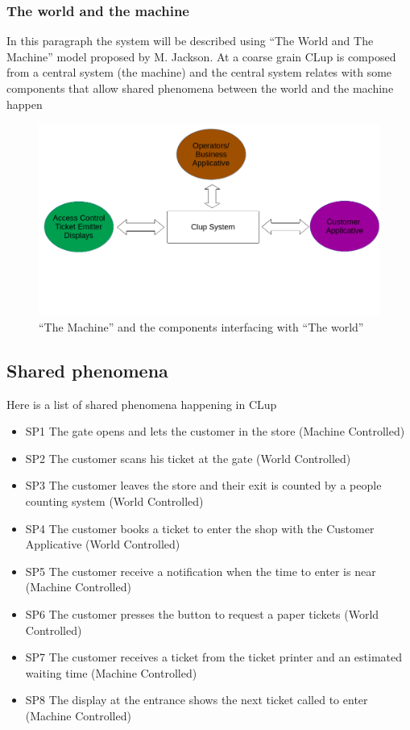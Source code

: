 \subsubsection{The world and the machine}
In this paragraph the system will be described using ``The World and The Machine'' model proposed by M. Jackson.
At a coarse grain CLup is composed from a central system (the machine) and the central system relates with some components that allow shared phenomena between the world and the machine happen
\begin{figure}
    \centering
    \includegraphics[width=\textwidth]{Images/system.png}
    \caption{\label{fig:Coarse_Grain_System}``The Machine'' and the components interfacing with ``The world''}
\end{figure}

\subsection{Shared phenomena}
Here is a list of shared phenomena happening in CLup
\begin{itemize}[label={}]
    \item SP1 The gate opens and lets the customer in the store (Machine Controlled)
    \item SP2 The customer scans his ticket at the gate (World Controlled)
    \item SP3 The customer leaves the store and their exit is counted by a people counting system (World Controlled)
    \item SP4 The customer books a ticket to enter the shop with the Customer Applicative (World Controlled)
    \item SP5 The customer receive a notification when the time to enter is near (Machine Controlled)
    \item SP6 The customer presses the button to request a paper tickets (World Controlled)
    \item SP7 The customer receives a ticket from the ticket printer and an estimated waiting time (Machine Controlled)
    \item SP8 The display at the entrance shows the next ticket called to enter (Machine Controlled)
\end{itemize}

